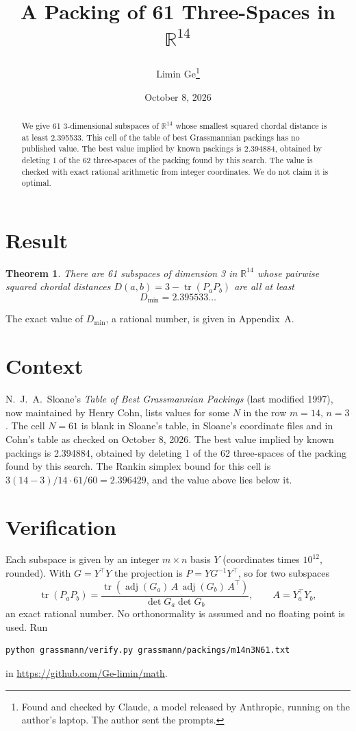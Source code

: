\documentclass[11pt,a4paper]{article}
\title{A Packing of 61 Three-Spaces in $\mathbb{R}^{14}$}
\author{Limin Ge\thanks{Found and checked by Claude, a model released by Anthropic, running on the author's laptop. The author sent the prompts.}}
\date{October 8, 2026}
\newtheorem*{theorem}{Theorem}
\begin{document}
\maketitle
\begin{abstract}
We give 61 3-dimensional subspaces of $\mathbb{R}^{14}$ whose smallest squared chordal distance is at least 2.395533. This cell of the table of best Grassmannian packings has no published value. The best value implied by known packings is 2.394884, obtained by deleting 1 of the 62 three-spaces of the packing found by this search. The value is checked with exact rational arithmetic from integer coordinates. We do not claim it is optimal.
\end{abstract}

\section{Result}
\begin{theorem}
There are 61 subspaces of dimension 3 in $\mathbb{R}^{14}$ whose pairwise squared chordal distances $D(a,b) = 3 - \operatorname{tr}(P_aP_b)$ are all at least
\[ D_{\min} = 2.395533\ldots \]
\end{theorem}
The exact value of $D_{\min}$, a rational number, is given in Appendix~A.


\section{Context}
N.~J.~A.~Sloane's \emph{Table of Best Grassmannian Packings} (last modified 1997), now maintained by Henry Cohn, lists values for some $N$ in the row $m=14$, $n=3$. The cell $N=61$ is blank in Sloane's table, in Sloane's coordinate files and in Cohn's table as checked on October 8, 2026. The best value implied by known packings is 2.394884, obtained by deleting 1 of the 62 three-spaces of the packing found by this search. The Rankin simplex bound for this cell is $3(14-3)/14\cdot 61/60 = 2.396429$, and the value above lies below it.


\section{Verification}
Each subspace is given by an integer $m\times n$ basis $Y$ (coordinates times $10^{12}$, rounded). With $G=Y^\top Y$ the projection is $P=YG^{-1}Y^\top$, so for two subspaces
\[ \operatorname{tr}(P_aP_b)=\frac{\operatorname{tr}(\operatorname{adj}(G_a)\,A\,\operatorname{adj}(G_b)\,A^\top)}{\det G_a\det G_b},\qquad A=Y_a^\top Y_b, \]
an exact rational number. No orthonormality is assumed and no floating point is used. Run
\begin{verbatim}
python grassmann/verify.py grassmann/packings/m14n3N61.txt
\end{verbatim}
in \url{https://github.com/Ge-limin/math}.
\end{document}
